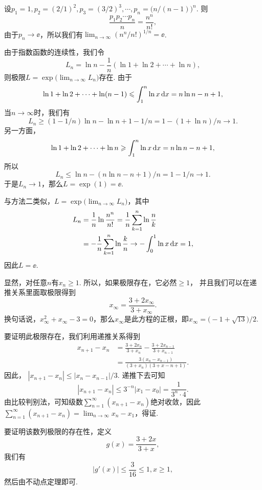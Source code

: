 \begin{ans}
  \method 设$p_1=1,p_2=(2/1)^2,p_3=(3/2)^3,\cdots,p_n=\big(n/(n-1)\big)^n$. 则
  \[ \frac{p_1p_2\cdots p_n}n = \frac{n^n}{n!}, \]
  由于$p_n\to\ee$，所以我们有$\lim_{n\to\infty}(n^n/n!)^{1/n}=\ee$.

  \method 由于指数函数的连续性，我们令
  \[ L_n=\ln n-\frac1n(\ln 1+\ln2+\cdots+\ln n), \]
  则极限$L=\exp\big(\lim_{n\to\infty}L_n\big)$存在. 由于
  \[ \ln1+\ln2+\cdots+\ln(n-1)\leqslant \int_1^n\ln x\,\mathrm dx
  =n\ln n-n+1, \]
  当$n\to\infty$时，我们有
  \[ L_n\ge(1-1/n)\ln n-\ln n+1-1/n =1-(1+\ln n)/n\to1. \]
  另一方面，
  \[ \ln1+\ln2+\cdots+\ln n\geqslant\int_1^n\ln x\,\mathrm dx=n\ln n-n+1, \]
  所以
  \[ L_n\le \ln n-(n\ln n-n+1)/n=1-1/n\to1. \]
  于是$L_n\to1$，那么$L=\exp(1)=\ee$.

  \method 与方法二类似，$L=\exp\big(\lim_{n\to\infty}L_n\big)$，其中
  \begin{align*}
    L_n & = \frac1n\ln \frac{n^n}{n!}
     = \frac1n \sum_{k=1}^n \ln \frac nk\\
     & = -\frac1n \sum_{k=1}^n \ln \frac kn
     \to - \int_0^1\ln x\,\mathrm dx = 1,
  \end{align*}
  因此$L=\ee$.
\end{ans}

\begin{ans}
  \method 显然，对任意$n$有$x_n\ge1$. 所以，如果极限存在，它必然$\ge1$， 并且我们可以在递推关系里面取极限得到
  \[ x_\infty = \frac{3+2x_\infty}{3+x_\infty}. \]
  换句话说，$x_\infty^2+x_\infty-3=0$，那么$x_\infty$是此方程的正根，即$x_\infty=\big(-1+\sqrt{13}\big)/2$.

  要证明此极限存在，我们利用递推关系得到
  \begin{align*}
    x_{n+1}-x_n & = \frac{3+2x_n}{3+x_n}-
      \frac{3+2x_{n-1}}{3+x_{n-1}} \\
      & = \frac{3(x_n-x_{n-1})}{(3+x_n)(3+x-{n+1})}.
  \end{align*}
  因此， $|x_{n+1}-x_n|\le|x_n-x_{n-1}|/3$. 递推下去可知
  \[ |x_{n+1}-x_n|\le3^{-n}|x_1-x_0|=\frac1{3^n\cdot 4}. \]
  由比较判别法，可知级数$\sum_{n=1}^\infty(x_{n+1}-x_n)$绝对收敛，因此$\sum_{n=1}^\infty(x_{n+1}-x_n)=\lim_{n\to\infty}x_n-x_1$，得证.

  \method 要证明该数列极限的存在性，定义
    \[ g(x) = \frac{3+2x}{3+x}, \]
  我们有
    \[ |g'(x)| \le \frac3{16}\le 1,x\ge1,  \]
    然后由不动点定理即可.
\end{ans}

